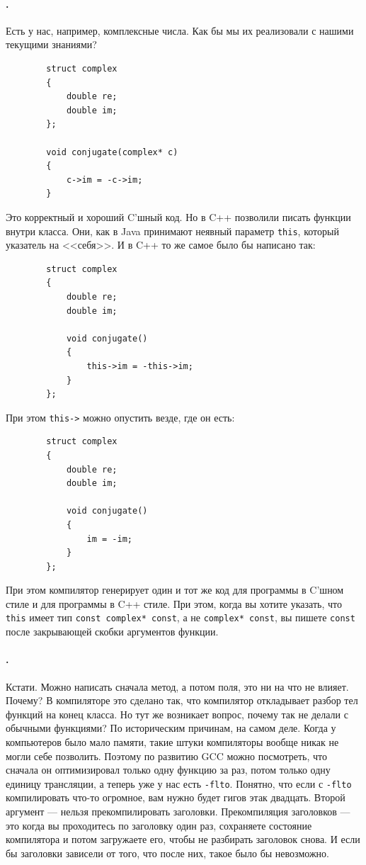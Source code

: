 \documentclass{article}
\begin{document}
    \paragraph{.}
    Есть у нас, например, комплексные числа. Как бы мы их реализовали с нашими текущими знаниями?
    \begin{verbatim}
        struct complex
        {
            double re;
            double im;
        };

        void conjugate(complex* c)
        {
            c->im = -c->im;
        }
    \end{verbatim}
    Это корректный и хороший C'шный код. Но в C++ позволили писать функции внутри класса. Они, как в Java принимают неявный параметр \texttt{this}, который указатель на <<себя>>. И в C++ то же самое было бы написано так:
    \begin{verbatim}
        struct complex
        {
            double re;
            double im;

            void conjugate()
            {
                this->im = -this->im;
            }
        };
    \end{verbatim}
    При этом \texttt{this->} можно опустить везде, где он есть:
    \begin{verbatim}
        struct complex
        {
            double re;
            double im;
            
            void conjugate()
            {
                im = -im;
            }
        };
    \end{verbatim}
    При этом компилятор генерирует один и тот же код для программы в C'шном стиле и для программы в C++ стиле. При этом, когда вы хотите указать, что \texttt{this} имеет тип \texttt{const complex* const}, а не \texttt{complex* const}, вы пишете \texttt{const} после закрывающей скобки аргументов функции.
    \paragraph{.}
    Кстати. Можно написать сначала метод, а потом поля, это ни на что не влияет. Почему? В компиляторе это сделано так, что компилятор откладывает разбор тел функций на конец класса. Но тут же возникает вопрос, почему так не делали с обычными функциями? По историческим причинам, на самом деле. Когда у компьютеров было мало памяти, такие штуки компиляторы вообще никак не могли себе позволить. Поэтому по развитию GCC можно посмотреть, что сначала он оптимизировал только одну функцию за раз, потом только одну единицу трансляции, а теперь уже у нас есть \texttt{-flto}. Понятно, что если с \texttt{-flto} компилировать что-то огромное, вам нужно будет гигов этак двадцать. Второй аргумент --- нельзя прекомпилировать заголовки. Прекомпиляция заголовков --- это когда вы проходитесь по заголовку один раз, сохраняете состояние компилятора и потом загружаете его, чтобы не разбирать заголовок снова. И если бы заголовки зависели от того, что после них, такое было бы невозможно.
\end{document}
